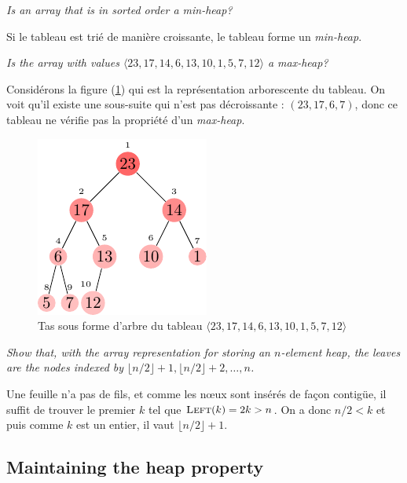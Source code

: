 \begin{description}
\begin{ex}
    \end{ex}
   \textit{Is an array that is in sorted order a min-heap?}
    \begin{ex} %
      Si le tableau est tri\'e de mani\`ere croissante, le tableau forme un \textit{min-heap}.
    \end{ex}
   \textit{Is the array with values $\langle 23, 17, 14, 6, 13, 10, 1, 5, 7, 12\rangle$ a max-heap?}
    \begin{ex}
      Consid\'erons la figure (\ref{fig:6.1-6}) qui est la repr\'esentation arborescente du tableau. On voit qu'il existe une sous-suite qui n'est pas d\'ecroissante : $(23, 17, 6, 7)$, donc ce tableau ne v\'erifie pas la propri\'et\'e d'un \textit{max-heap}.
        \begin{figure}[H]
          \centering
        \includegraphics[scale=1.5]{img/6_1-6/6_1-6.pdf}
        \caption{Tas sous forme d'arbre du tableau $\langle 23, 17, 14, 6, 13, 10, 1, 5, 7, 12\rangle$}
          \label{fig:6.1-6}
        \end{figure}
    \end{ex}
   \textit{Show that, with the array representation for storing an $n$-element heap, the leaves are the nodes indexed by $\lfloor n/2 \rfloor +1, \lfloor n/2\rfloor + 2, \ldots, n$.}
    \begin{ex}
      Une feuille n'a pas de fils, et comme les n\oe ux sont ins\'er\'es de fa\c{c}on contig\"ue, il suffit de trouver le premier    $k$ tel que $\textsc{Left}(k) =2k > n$. On a donc $n/2 < k$ et puis comme $k$ est un entier, il vaut $\lfloor n/2 \rfloor +1$.
    \end{ex}
\end{description}

\subsection{Maintaining the heap property}

